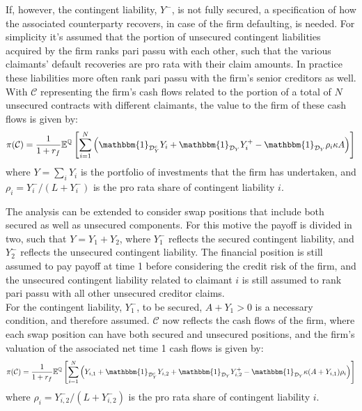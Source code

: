 \documentclass[../main.tex]{subfiles}
\begin{document}
        If, however, the contingent liability, $Y^{-}$, is not fully secured, a specification of how the associated counterparty recovers, in case of the firm defaulting, is needed.
        For simplicity it's assumed that the portion of unsecured contingent liabilities acquired by the firm ranks pari passu with each other, such that the various claimants' default recoveries are pro rata with their claim amounts.
        In practice these liabilities more often rank pari passu with the firm's senior creditors as well.
        With $\mathcal{C}$ representing the firm's cash flows related to the portion of a total of $N$ unsecured contracts with different claimants, the value to the firm of these cash flows is given by:
        \begin{equation}
            \pi(\mathcal{C}) = \discountfactor \mathbb{E}^{\mathbb{Q}}\left[
            \sum_{i=1}^{N} \left(
                \mathbbm{1}_{\mathcal{D}_{Y}^{c}}Y_{i}
                + \mathbbm{1}_{\mathcal{D}_{Y}} Y_{i}^{+}
                - \mathbbm{1}_{\mathcal{D}_{Y}} \rho_{i} \kappa A
            \right)\right]
        \end{equation}
        where $Y = \sum_{i} Y_{i}$ is the portfolio of investments that the firm has undertaken, and $\rho_{i} = Y_{i}^{-}/(L + Y_{i}^{-})$ is the pro rata share of contingent liability $i$. 

        The analysis can be extended to consider swap positions that include both secured as well as unsecured components.
        For this motive the payoff is divided in two, such that $Y=Y_1 + Y_2$, where $Y_1^{-}$ reflects the secured contingent liability, and $Y_2^{-}$ reflects the unsecured contingent liability.
        The financial position is still assumed to pay payoff at time 1 before considering the credit risk of the firm, and the unsecured contingent liability related to claimant $i$ is still assumed to rank pari passu with all other unsecured creditor claims.\\
        For the contingent liability, $Y_1^{-}$, to be secured, $A+Y_1 > 0$ is a necessary condition, and therefore assumed.
        $\mathcal{C}$ now reflects the cash flows of the firm, where each swap position can have both secured and unsecured positions, and the firm's valuation of the associated net time 1 cash flows is given by:
        \begin{equation}
            \pi(\mathcal{C}) = \discountfactor \mathbb{E}^{\mathbb{Q}}\left[
            \sum_{i=1}^{N} \left(
                Y_{i,1}
                + \mathbbm{1}_{\mathcal{D}_{Y}^{c}}Y_{i,2}
                + \mathbbm{1}_{\mathcal{D}_{Y}} Y_{i,2}^{+}
                - \mathbbm{1}_{\mathcal{D}_{Y}} \kappa (A + Y_{i,1}) \rho_{i}
            \right)\right]
        \end{equation}
        where $\rho_{i} = Y_{i,2}^{-}/(L + Y_{i,2}^{-})$ is the pro rata share of contingent liability $i$.
        
\end{document}
